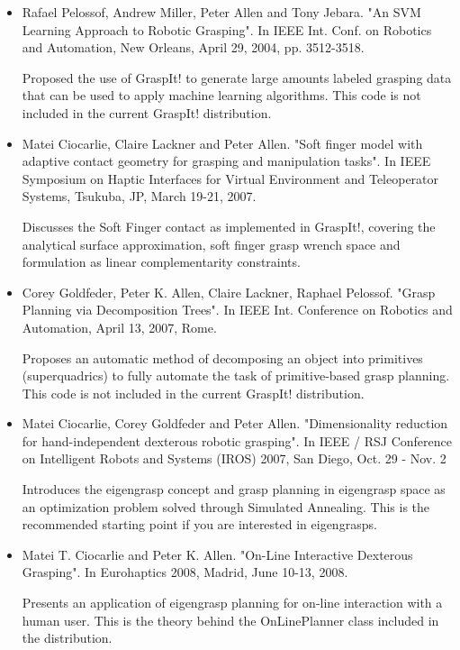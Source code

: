 \begin{itemize}
\item Rafael Pelossof, Andrew Miller, Peter Allen and Tony Jebara. "An SVM
Learning Approach to Robotic Grasping". In IEEE Int. Conf. on Robotics
and Automation, New Orleans, April 29, 2004, pp. 3512-3518.

Proposed the use of GraspIt! to generate large amounts labeled
grasping data that can be used to apply machine learning
algorithms. This code is not included in the current GraspIt!
distribution.

\item Matei Ciocarlie, Claire Lackner and Peter Allen. "Soft finger model
with adaptive contact geometry for grasping and manipulation
tasks". In IEEE Symposium on Haptic Interfaces for Virtual Environment
and Teleoperator Systems, Tsukuba, JP, March 19-21, 2007.

Discusses the Soft Finger contact as implemented in GraspIt!, covering
the analytical surface approximation, soft finger grasp wrench space
and formulation as linear complementarity constraints.

\item Corey Goldfeder, Peter K. Allen, Claire Lackner, Raphael
Pelossof. "Grasp Planning via Decomposition Trees". In IEEE
Int. Conference on Robotics and Automation, April 13, 2007, Rome.

Proposes an automatic method of decomposing an object into primitives
(superquadrics) to fully automate the task of primitive-based grasp
planning. This code is not included in the current GraspIt!
distribution.

\item Matei Ciocarlie, Corey Goldfeder and Peter Allen. "Dimensionality
reduction for hand-independent dexterous robotic grasping". In IEEE /
RSJ Conference on Intelligent Robots and Systems (IROS) 2007, San
Diego, Oct. 29 - Nov. 2

Introduces the eigengrasp concept and grasp planning in eigengrasp
space as an optimization problem solved through Simulated
Annealing. This is the recommended starting point if you are
interested in eigengrasps.

\item Matei T. Ciocarlie and Peter K. Allen. "On-Line Interactive
Dexterous Grasping". In Eurohaptics 2008, Madrid, June 10-13, 2008.

Presents an application of eigengrasp planning for on-line interaction
with a human user. This is the theory behind the OnLinePlanner class
included in the distribution.


\end{itemize}
